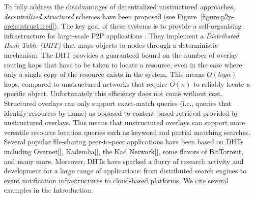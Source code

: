 To fully address the disadvantages of decentralized unstructured approaches,
\emph{decentralized structured} schemes have been proposed (see
Figure~\ref{figure:p2p-archs:structured}).  The key goal
of these systems is to provide a self-organising
infrastructure for large-scale P2P applications
\cite{ratnasamy_can_2001,stoica_chord_2001,antony_pastry_2001,zhao_tapestry_2001,maymounkov_kademlia_2002,rgrk_bamboo_2004}.
They implement a \emph{Distributed Hash Table (DHT)} that maps objects to nodes
through a deterministic mechanism. 
The DHT  
provides a guaranteed bound on the number of overlay routing
hops that have to be taken to locate a resource, even in the
case where only a single copy of the resource exists in the system.  This means
$O \left ( log n \right )$ hops, compared to unstructured networks that require
$O \left ( n \right )$ to reliably locate a specific object.
Unfortunately this efficiency does not come without cost. Structured overlays
can only support exact-match queries (i.e., queries that identify resources
by name) as opposed to content-based
retrieval provided by unstructured overlays.  This means 
that unstructured overlays can support more 
versatile resource location queries such as keyword and partial matching
searches.  Several popular file-sharing peer-to-peer applications have
been based on DHTs including Overnet[], Kademlia[], the Kad Network[], 
some flavors of BitTorrent, and many
more.  Moreover, DHTs have sparked a flurry of research activity and 
development for a large range of applications: from distributed search 
engines to event notification infrastructures to cloud-based platforms.
We cite several examples in the Introduction.


